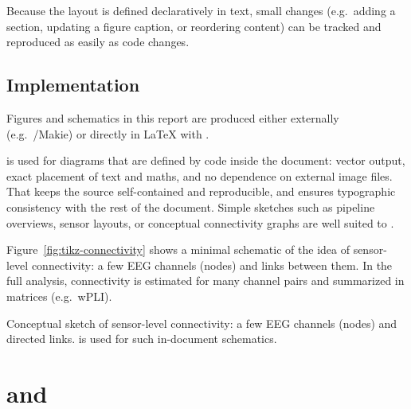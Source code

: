 \begin{multicols}{1}

\medskip
Because the layout is defined declaratively in text, small changes (e.g.\ adding a section, updating a figure caption, or reordering content) can be tracked and reproduced as easily as code changes.

\subsection{\PGF{} \TikZ{} Implementation}

Figures and schematics in this report are produced either externally (e.g.\ \Julia{}/Makie) or directly in \LaTeX{} with \PGF{} \TikZ{}. 

\TikZ{} is used for diagrams that are defined by code inside the document: vector output, exact placement of text and maths, and no dependence on external image files. That keeps the source self-contained and reproducible, and ensures typographic consistency with the rest of the document. Simple sketches such as pipeline overviews, sensor layouts, or conceptual connectivity graphs are well suited to \TikZ{}.

Figure~\ref{fig:tikz-connectivity} shows a minimal schematic of the idea of sensor-level connectivity: a few EEG channels (nodes) and links between them. In the full analysis, connectivity is estimated for many channel pairs and summarized in matrices (e.g.\ wPLI).

\begin{marginfigure}
\centering
{}
\caption{Conceptual sketch of sensor-level connectivity: a few EEG channels (nodes) and directed links. \TikZ{} is used for such in-document schematics.}
\label{fig:tikz-connectivity}
\end{marginfigure}

\section{\Git{} and \GitHub{}}


\end{multicols}
